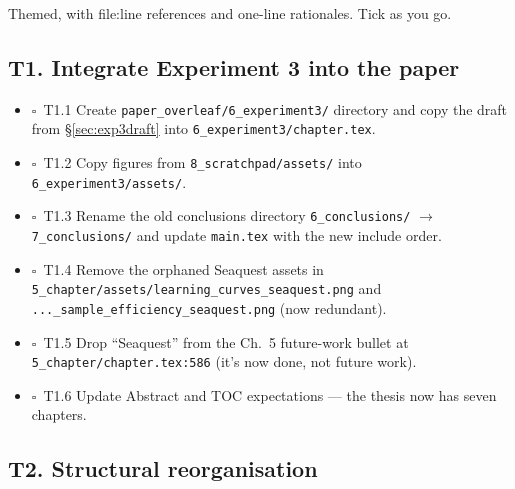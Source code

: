 \documentclass[11pt,a4paper]{article}
\newcommand{\todoitem}{$\square$~}
\newcommand{\fileline}[1]{\texttt{\small #1}}
\begin{document}
Themed, with file:line references and one-line rationales. Tick as you go.

\subsection*{T1. Integrate Experiment 3 into the paper}

\begin{itemize}[leftmargin=*,itemsep=2pt]
  \item \todoitem T1.1 Create \fileline{paper\_overleaf/6\_experiment3/}
  directory and copy the draft from \S\ref{sec:exp3draft} into
  \fileline{6\_experiment3/chapter.tex}.
  \item \todoitem T1.2 Copy figures from
  \fileline{8\_scratchpad/assets/} into
  \fileline{6\_experiment3/assets/}.
  \item \todoitem T1.3 Rename the old conclusions directory
  \fileline{6\_conclusions/} $\to$ \fileline{7\_conclusions/} and update
  \fileline{main.tex} with the new include order.
  \item \todoitem T1.4 Remove the orphaned Seaquest assets in
  \fileline{5\_chapter/assets/learning\_curves\_seaquest.png} and
  \fileline{...\_sample\_efficiency\_seaquest.png} (now redundant).
  \item \todoitem T1.5 Drop ``Seaquest'' from the Ch.~5 future-work
  bullet at \fileline{5\_chapter/chapter.tex:586} (it's now done, not
  future work).
  \item \todoitem T1.6 Update Abstract and TOC expectations --- the
  thesis now has seven chapters.
\end{itemize}

\subsection*{T2. Structural reorganisation}
\end{document}
